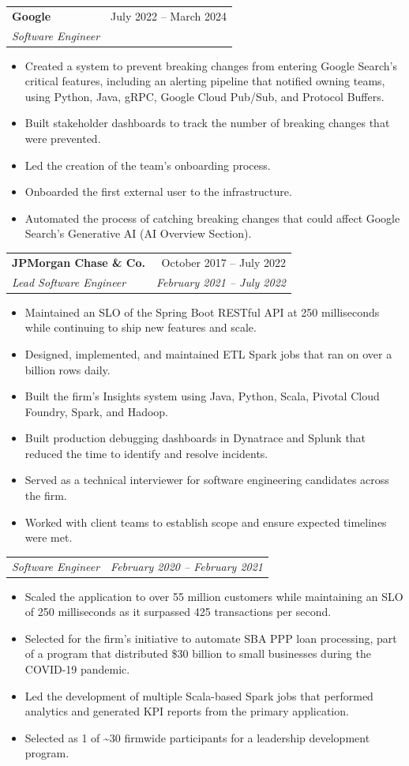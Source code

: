 \documentclass[letterpaper,10pt]{article}
\makeatletter
\newcommand{\resumeItem}[1]{
  \item\small{#1 \vspace{-1pt}}
}
\newcommand{\resumeSubheading}[4]{
  \vspace{-1pt}\item
    \begin{tabular*}{0.97\textwidth}[t]{l@{\extracolsep{\fill}}r}
      \textbf{#1} & #2 \\
      \textit{\small#3} & \textit{\small #4} \\
    \end{tabular*}\vspace{-4pt}
}
\newcommand{\resumeSubheadingStacked}[4]{
  \vspace{-1pt}\item
    \begin{tabular*}{0.97\textwidth}[t]{l@{\extracolsep{\fill}}r}
      \textbf{#1} & #2 \\[4pt]
      \textit{\small#3} & \textit{\small #4} \\
    \end{tabular*}\vspace{-4pt}
}
\newcommand{\resumeSubSubheading}[2]{
    \item
    \begin{tabular*}{0.97\textwidth}{l@{\extracolsep{\fill}}r}
      \textit{\small#1} & \textit{\small #2} \\
    \end{tabular*}\vspace{-4pt}
}
\newcommand{\resumeItemListStart}{\begin{itemize}[leftmargin=*, itemsep=1pt, topsep=1pt, parsep=0pt, partopsep=0pt]}
\newcommand{\resumeItemListEnd}{\end{itemize}\vspace{-2pt}}
\makeatother
\begin{document}
    \resumeSubheading
      {Google}{July 2022 -- March 2024}
      {Software Engineer}{}
      \resumeItemListStart
        \resumeItem{Created a system to prevent breaking changes from entering Google Search's critical features, including an alerting pipeline that notified owning teams, using Python, Java, gRPC, Google Cloud Pub/Sub, and Protocol Buffers.}
        \resumeItem{Built stakeholder dashboards to track the number of breaking changes that were prevented.}
        \resumeItem{Led the creation of the team's onboarding process.}
        \resumeItem{Onboarded the first external user to the infrastructure.}
        \resumeItem{Automated the process of catching breaking changes that could affect Google Search's Generative AI (AI Overview Section).}
      \resumeItemListEnd

    \resumeSubheadingStacked
      {JPMorgan Chase \& Co.}{October 2017 -- July 2022}
      {Lead Software Engineer}{February 2021 -- July 2022}
      \resumeItemListStart
        \resumeItem{Maintained an SLO of the Spring Boot RESTful API at 250 milliseconds while continuing to ship new features and scale.}
        \resumeItem{Designed, implemented, and maintained ETL Spark jobs that ran on over a billion rows daily.}
        \resumeItem{Built the firm's Insights system using Java, Python, Scala, Pivotal Cloud Foundry, Spark, and Hadoop.}
        \resumeItem{Built production debugging dashboards in Dynatrace and Splunk that reduced the time to identify and resolve incidents.}
        \resumeItem{Served as a technical interviewer for software engineering candidates across the firm.}
        \resumeItem{Worked with client teams to establish scope and ensure expected timelines were met.}
      \resumeItemListEnd

      \resumeSubSubheading
        {Software Engineer}{February 2020 -- February 2021}
      \resumeItemListStart
        \resumeItem{Scaled the application to over 55 million customers while maintaining an SLO of 250 milliseconds as it surpassed 425 transactions per second.}
        \resumeItem{Selected for the firm's initiative to automate SBA PPP loan processing, part of a program that distributed \$30 billion to small businesses during the COVID-19 pandemic.}
        \resumeItem{Led the development of multiple Scala-based Spark jobs that performed analytics and generated KPI reports from the primary application.}
        \resumeItem{Selected as 1 of \textasciitilde30 firmwide participants for a leadership development program.}
      \resumeItemListEnd
\end{document}

